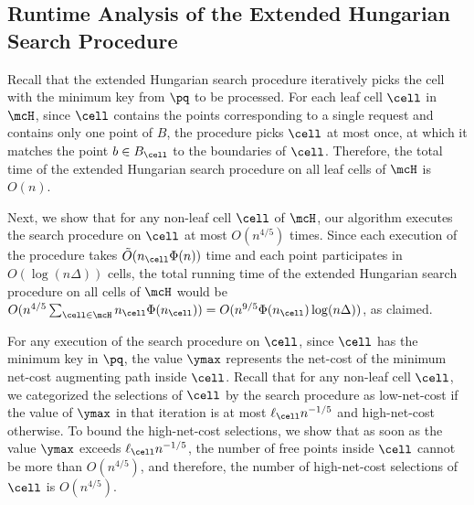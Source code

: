 %

%



%





%
%


%


%

%
%
%
%
%
%
%
%
%
%
%
%
%
%
%
%

%
%
%
%
%
%
%
%
%
%
%
%
%
%
%
%
%


\subsection{Runtime Analysis of the Extended Hungarian Search Procedure}\label{appendix:hung_time}
Recall that the extended Hungarian search procedure iteratively picks the cell with the minimum key from $\pq$ to be processed.
For each leaf cell $\cell$ in $\mcH$, since $\cell$ contains the points corresponding to a single request and contains only one point of $B$, the procedure picks $\cell$ at most once, at which it matches the point $b\in B_\cell$ to the boundaries of $\cell$. Therefore, the total time of the extended Hungarian search procedure on all leaf cells of $\mcH$ is $O(n)$. 

Next, we show that for any non-leaf cell $\cell$ of $\mcH$, our algorithm executes the search procedure on $\cell$ at most $O(n^{4/5})$ times. Since each execution of the procedure takes $\tilde{O}(n_{\cell}\Phi(n))$ time and each point participates in $O(\log (n\Delta))$ cells, the total running time of the extended Hungarian search procedure on all cells of $\mcH$ would be $O(n^{4/5}\sum_{\cell\in\mcH}n_\cell\Phi(n_\cell)) = O(n^{9/5}\Phi(n_\cell)\log(n\Delta))$, as claimed.

For any execution of the search procedure on $\cell$, since $\cell$ has the minimum key in $\pq$, the value $\ymax$ represents the net-cost of the minimum net-cost augmenting path inside $\cell$.
Recall that for any non-leaf cell $\cell$, we categorized the selections of $\cell$ by the search procedure as low-net-cost if the value of $\ymax$ in that iteration is at most $\ell_\cell n^{-1/5}$ and high-net-cost otherwise. 
To bound the high-net-cost selections, we show that as soon as the value $\ymax$ exceeds $\ell_\cell n^{-1/5}$, the number of free points inside $\cell$ cannot be more than $O(n^{4/5})$, and therefore, the number of high-net-cost selections of $\cell$ is $O(n^{4/5})$.

